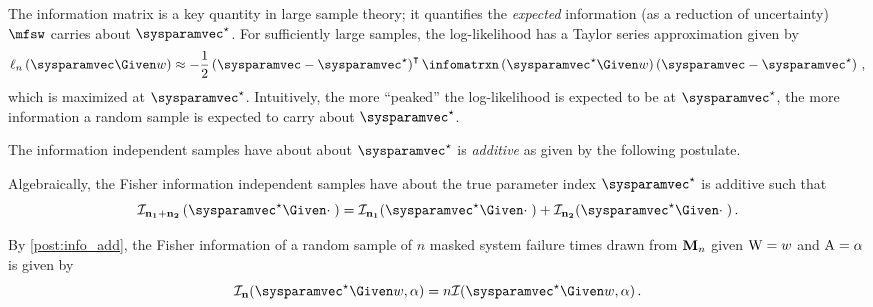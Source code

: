 \documentclass[../main.tex]{subfiles}
\begin{document}
The information matrix is a key quantity in large sample theory; it quantifies the \emph{expected} information (as a reduction of uncertainty) $\mfsw$ carries about $\tparam\sysparamvec$.
For sufficiently large samples, the log-likelihood has a Taylor series approximation given by
\begin{equation}
    \ell_n\left(\sysparamvec \Given w\right) \approx -\frac{1}{2}\left(\sysparamvec - \tparam\sysparamvec\right)^\intercal \infomatrxn\left(\tparam\sysparamvec \Given w\right)\left(\sysparamvec - \tparam\sysparamvec\right)\,,
\end{equation}
which is maximized at $\tparam\sysparamvec$. Intuitively, the more ``peaked'' the log-likelihood is expected to be at $\tparam\sysparamvec$, the more information a random sample is expected to carry about $\tparam\sysparamvec$.

The information independent samples have about about $\tparam\sysparamvec$ is \emph{additive} as given by the following postulate.
\begin{postulate}
\label{post:info_add}
Algebraically, the Fisher information independent samples have about the true parameter index $\tparam\sysparamvec$  is additive such that
\begin{equation}
    \infomatrx_{\matrx{n_1} + \matrx{n_2}}\left(\tparam\sysparamvec \Given 
    \cdot \; \right) = \infomatrx_{\matrx{n_1}}(\tparam\sysparamvec \Given 
    \cdot \;) + \infomatrx_{\matrx{n_2}}(\tparam\sysparamvec \Given \cdot \;)\,.
\end{equation}
\end{postulate}
By \cref{post:info_add}, the Fisher information of a random sample of $n$ masked system failure times drawn from $\mathbf{M}_n$ given $\mathrm{W} = w$ and $\mathrm{A} = \alpha$ is given by
\begin{equation}
    \infomatrx_{\matrx{n}}(\tparam\sysparamvec \Given w, \alpha) = n \infomatrx(\tparam\sysparamvec \Given w, \alpha)\,.
\end{equation}
\end{document}
